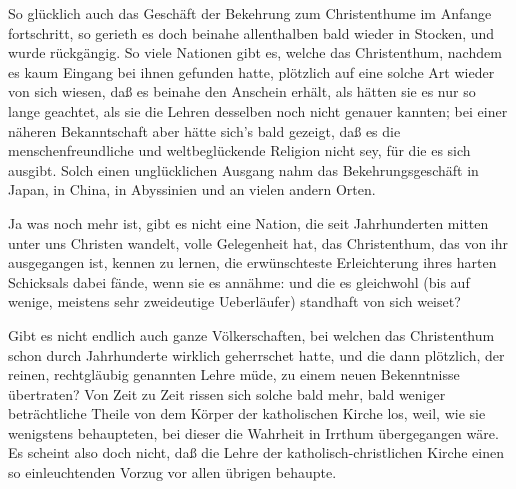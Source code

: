 \begin{aufza}
\item So glücklich auch das Geschäft der Bekehrung zum Christenthume im Anfange fortschritt, so gerieth es doch beinahe allenthalben bald wieder in Stocken, und wurde rückgängig. So viele Nationen gibt es, welche das Christenthum, nachdem es kaum Eingang bei ihnen gefunden hatte, plötzlich auf eine solche Art wieder von sich wiesen, daß es beinahe den Anschein erhält, als hätten sie es nur so lange geachtet, als sie die Lehren desselben noch nicht genauer kannten; bei einer näheren Bekanntschaft aber hätte sich's bald gezeigt, daß es die menschenfreundliche und weltbeglückende Religion nicht sey, für die es sich ausgibt. Solch einen unglücklichen Ausgang nahm das Bekehrungsgeschäft in Japan, in China, in Abyssinien und an vielen andern Orten.
\item Ja was noch mehr ist, gibt es nicht eine Nation, die seit Jahrhunderten mitten unter uns Christen wandelt, volle Gelegenheit hat, das Christenthum, das von ihr ausgegangen ist, kennen zu lernen, die erwünschteste Erleichterung ihres harten Schicksals dabei fände, wenn sie es annähme: und die es gleichwohl (bis auf wenige, meistens sehr zweideutige Ueberläufer) standhaft von sich weiset?
\item Gibt es nicht endlich auch ganze Völkerschaften, bei welchen das Christenthum schon durch Jahrhunderte wirklich geherrschet hatte, und die dann plötzlich, der reinen, rechtgläubig genannten Lehre müde, zu einem neuen Bekenntnisse übertraten? Von Zeit zu Zeit rissen sich solche bald mehr, bald weniger beträchtliche Theile von dem Körper der katholischen Kirche los, weil, wie sie wenigstens behaupteten, bei dieser die Wahrheit in Irrthum übergegangen wäre. Es scheint also doch nicht, daß die Lehre der katholisch-christlichen Kirche einen so einleuchtenden Vorzug vor allen übrigen behaupte.
\end{aufza}

\begin{center}\end{center}

